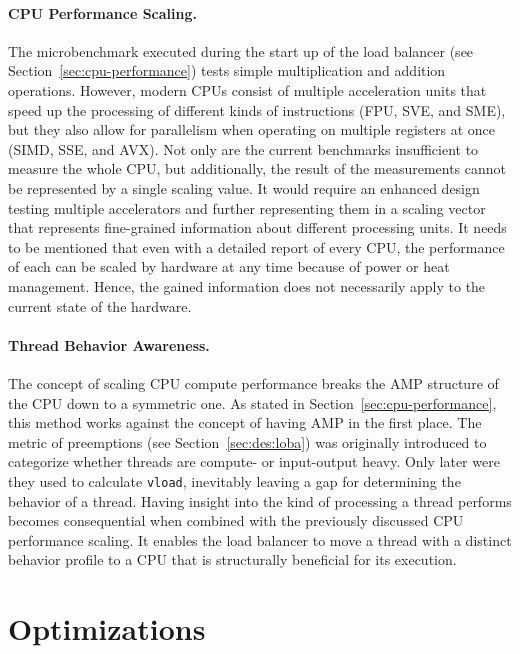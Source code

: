\paragraph{CPU Performance Scaling.}

The microbenchmark executed during the start up of the load balancer (see Section~\ref{sec:cpu-performance}) tests simple multiplication and addition operations.
However, modern CPUs consist of multiple acceleration units that speed up the processing of different kinds of instructions (FPU, SVE, and SME), but they also allow for parallelism when operating on multiple registers at once (SIMD, SSE, and AVX).
Not only are the current benchmarks insufficient to measure the whole CPU, but additionally, the result of the measurements cannot be represented by a single scaling value.
It would require an enhanced design testing multiple accelerators and further representing them in a scaling vector that represents fine-grained information about different processing units.
It needs to be mentioned that even with a detailed report of every CPU, the performance of each can be scaled by hardware at any time because of power or heat management.
Hence, the gained information does not necessarily apply to the current state of the hardware.

\paragraph{Thread Behavior Awareness.}

The concept of scaling CPU compute performance breaks the AMP structure of the CPU down to a symmetric one.
As stated in Section~\ref{sec:cpu-performance}, this method works against the concept of having AMP in the first place.
The metric of preemptions (see Section~\ref{sec:des:loba}) was originally introduced to categorize whether threads are compute- or input-output heavy.
Only later were they used to calculate \texttt{vload}, inevitably leaving a gap for determining the behavior of a thread.
Having insight into the kind of processing a thread performs becomes consequential when combined with the previously discussed CPU performance scaling.
It enables the load balancer to move a thread with a distinct behavior profile to a CPU that is structurally beneficial for its execution.

\section{Optimizations}
\label{sec:optimizations}

